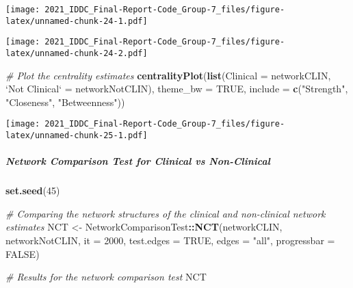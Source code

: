 \documentclass[
]{article}
\newenvironment{Shaded}{\begin{snugshade}}{\end{snugshade}}
\newcommand{\CommentTok}[1]{\textcolor[rgb]{0.56,0.35,0.01}{\textit{#1}}}
\newcommand{\DataTypeTok}[1]{\textcolor[rgb]{0.13,0.29,0.53}{#1}}
\newcommand{\DecValTok}[1]{\textcolor[rgb]{0.00,0.00,0.81}{#1}}
\newcommand{\KeywordTok}[1]{\textcolor[rgb]{0.13,0.29,0.53}{\textbf{#1}}}
\newcommand{\NormalTok}[1]{#1}
\newcommand{\OperatorTok}[1]{\textcolor[rgb]{0.81,0.36,0.00}{\textbf{#1}}}
\newcommand{\OtherTok}[1]{\textcolor[rgb]{0.56,0.35,0.01}{#1}}
\newcommand{\StringTok}[1]{\textcolor[rgb]{0.31,0.60,0.02}{#1}}
\begin{document}
\texttt{[image: 2021\_IDDC\_Final-Report-Code\_Group-7\_files/figure-latex/unnamed-chunk-24-1.pdf]}

\begin{Shaded}
\end{Shaded}

\texttt{[image: 2021\_IDDC\_Final-Report-Code\_Group-7\_files/figure-latex/unnamed-chunk-24-2.pdf]}

\begin{Shaded}
\begin{Highlighting}[]
\CommentTok{# Plot the centrality estimates}
\KeywordTok{centralityPlot}\NormalTok{(}\KeywordTok{list}\NormalTok{(}\DataTypeTok{Clinical =}\NormalTok{ networkCLIN,}
                    \StringTok{`}\DataTypeTok{Not Clinical}\StringTok{`}\NormalTok{ =}\StringTok{ }\NormalTok{networkNotCLIN),}
               \DataTypeTok{theme_bw =} \OtherTok{TRUE}\NormalTok{,}
               \DataTypeTok{include =} \KeywordTok{c}\NormalTok{(}\StringTok{"Strength"}\NormalTok{,}
                           \StringTok{"Closeness"}\NormalTok{,}
                           \StringTok{"Betweenness"}\NormalTok{))}
\end{Highlighting}
\end{Shaded}

\texttt{[image: 2021\_IDDC\_Final-Report-Code\_Group-7\_files/figure-latex/unnamed-chunk-25-1.pdf]}

\hypertarget{network-comparison-test-for-clinical-vs-non-clinical}{%
\subparagraph{Network Comparison Test for Clinical vs
Non-Clinical}\label{network-comparison-test-for-clinical-vs-non-clinical}}

\begin{Shaded}
\begin{Highlighting}[]
\KeywordTok{set.seed}\NormalTok{(}\DecValTok{45}\NormalTok{)}

\CommentTok{# Comparing the network structures of the clinical and non-clinical network estimates}
\NormalTok{NCT <-}\StringTok{ }
\NormalTok{NetworkComparisonTest}\OperatorTok{::}\KeywordTok{NCT}\NormalTok{(networkCLIN, networkNotCLIN,}
                           \DataTypeTok{it =} \DecValTok{2000}\NormalTok{,}
                           \DataTypeTok{test.edges =} \OtherTok{TRUE}\NormalTok{,}
                           \DataTypeTok{edges =} \StringTok{"all"}\NormalTok{,}
                           \DataTypeTok{progressbar =} \OtherTok{FALSE}\NormalTok{)}

\CommentTok{# Results for the network comparison test}
\NormalTok{NCT}
\end{Highlighting}
\end{Shaded}
\end{document}
